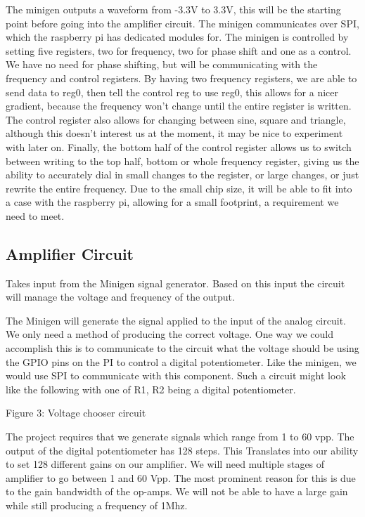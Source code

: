 \documentclass{article}	%
\begin{document}
\begin{multicols}{2}
The minigen outputs a waveform from -3.3V to 3.3V, this will be the starting point before going into the amplifier circuit. The minigen communicates over SPI, which the raspberry pi has dedicated modules for. The minigen is controlled by setting five registers, two for frequency, two for phase shift and one as a control. We have no need for phase shifting, but will be communicating with the frequency and control registers. By having two frequency registers, we are able to send data to reg0, then tell the control reg to use reg0, this allows for a nicer gradient, because the frequency won’t change until the entire register is written. The control register also allows for changing between sine, square and triangle, although this doesn’t interest us at the moment, it may be nice to experiment with later on. Finally, the bottom half of the control register allows us to switch between writing to the top half, bottom or whole frequency register, giving us the ability to accurately dial in small changes to the register, or large changes, or just rewrite the entire frequency. Due to the small chip size, it will be able to fit into a case with the raspberry pi, allowing for a small footprint, a requirement we need to meet.  

\subsection{Amplifier Circuit}

Takes input from the Minigen signal generator. Based on this input the circuit will manage the voltage and frequency of the output.

The Minigen will generate the signal applied to the input of the analog circuit. We only need a method of producing the correct voltage. One way we could accomplish this is to communicate to the circuit what the voltage should be using the GPIO pins on the PI to control a digital potentiometer. Like the minigen, we would use SPI to communicate with this component. Such a circuit might look like the following with one of R1, R2 being a digital potentiometer.

Figure 3: Voltage chooser circuit

The project requires that we generate signals which range from 1 to 60 vpp. The output of the digital potentiometer has 128 steps. This Translates into our ability to set 128 different gains on our amplifier. We will need multiple stages of amplifier to go between 1 and 60 Vpp. The most prominent reason for this is due to the gain bandwidth of the op-amps. We will not be able to have a large gain while still producing a frequency of 1Mhz.


\end{multicols}
\end{document}
